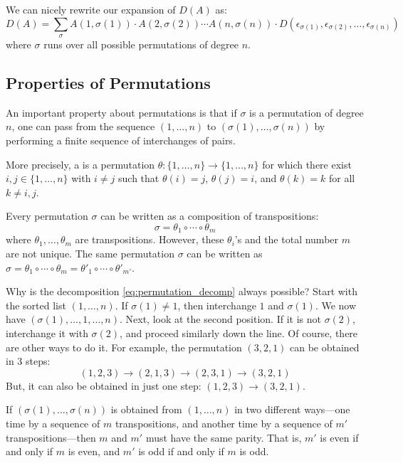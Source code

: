 We can nicely rewrite our expansion of $D(A)$ as:
\[
D(A) = \sum_{\sigma} A(1,\sigma(1)) \cdot A(2,\sigma(2)) \cdots A(n,\sigma(n)) \cdot D(\epsilon_{\sigma(1)}, \epsilon_{\sigma(2)}, \dots, \epsilon_{\sigma(n)})
\]
where $\sigma$ runs over all possible permutations of degree $n$.

\subsection{Properties of Permutations}

An important property about permutations is that if $\sigma$ is a permutation of degree $n$, one can pass from the sequence $(1, \dots, n)$ to $(\sigma(1), \dots, \sigma(n))$ by performing a finite sequence of interchanges of pairs.

More precisely, a  is a permutation $\theta : \{1, \dots, n\} \to \{1, \dots, n\}$ for which there exist $i, j \in \{1, \dots, n\}$ with $i \neq j$ such that $\theta(i) = j$, $\theta(j) = i$, and $\theta(k) = k$ for all $k \neq i,j$.

Every permutation $\sigma$ can be written as a composition of transpositions:
\begin{equation} \label{eq:permutation_decomp}
  \sigma = \theta_1 \circ \cdots \circ \theta_m
\end{equation}
where $\theta_1, \dots, \theta_m$ are transpositions. However, these $\theta_i$'s and the total number $m$ are not unique. The same permutation $\sigma$ can be written as $\sigma = \theta_1 \circ \cdots \circ \theta_m = \theta'_1 \circ \cdots \circ \theta'_{m'}$.

\begin{remark}
  Why is the decomposition \eqref{eq:permutation_decomp} always possible? Start with the sorted list $(1, \dots, n)$. If $\sigma(1) \neq 1$, then interchange $1$ and $\sigma(1)$. We now have $(\sigma(1), \dots, 1, \dots, n)$. Next, look at the second position. If it is not $\sigma(2)$, interchange it with $\sigma(2)$, and proceed similarly down the line. Of course, there are other ways to do it. For example, the permutation $(3,2,1)$ can be obtained in 3 steps:
  \[ (1,2,3) \to (2,1,3) \to (2,3,1) \to (3,2,1) \]
  But, it can also be obtained in just one step: $(1,2,3) \to (3,2,1)$.
\end{remark}

\begin{lemma}\label{lem:permutation_parity}
  If $(\sigma(1), \dots, \sigma(n))$ is obtained from $(1, \dots, n)$ in two different ways—one time by a sequence of $m$ transpositions, and another time by a sequence of $m'$ transpositions—then $m$ and $m'$ must have the same parity. That is, $m'$ is even if and only if $m$ is even, and $m'$ is odd if and only if $m$ is odd.
\end{lemma}

